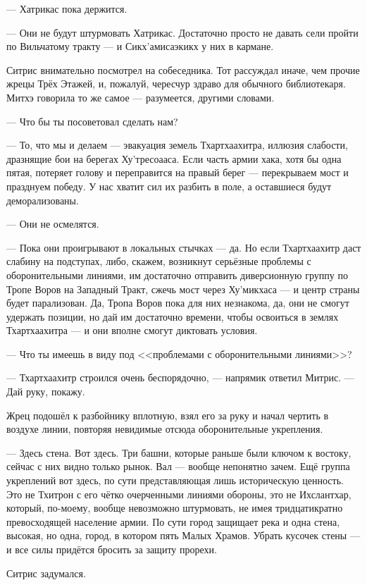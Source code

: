 --- Хатрикас пока держится.

--- Они не будут штурмовать Хатрикас.
Достаточно просто не давать сели пройти по Вильчатому тракту --- и Сикх'амисаэкикх у них в кармане.

Ситрис внимательно посмотрел на собеседника.
Тот рассуждал иначе, чем прочие жрецы Трёх Этажей, и, пожалуй, чересчур здраво для обычного библиотекаря.
Митхэ говорила то же самое --- разумеется, другими словами.

--- Что бы ты посоветовал сделать нам?

--- То, что мы и делаем --- эвакуация земель Тхартхаахитра, иллюзия слабости, дразнящие бои на берегах Ху'тресоааса.
Если часть армии хака, хотя бы одна пятая, потеряет голову и переправится на правый берег --- перекрываем мост и празднуем победу.
У нас хватит сил их разбить в поле, а оставшиеся будут деморализованы.

--- Они не осмелятся.

--- Пока они проигрывают в локальных стычках --- да.
Но если Тхартхаахитр даст слабину на подступах, либо, скажем, возникнут серьёзные проблемы с оборонительными линиями, им достаточно отправить диверсионную группу по Тропе Воров на Западный Тракт, сжечь мост через Ху'микхаса --- и центр страны будет парализован.
Да, Тропа Воров пока для них незнакома, да, они не смогут удержать позиции, но дай им достаточно времени, чтобы освоиться в землях Тхартхаахитра --- и они вполне смогут диктовать условия.

--- Что ты имеешь в виду под <<проблемами с оборонительными линиями>>?

--- Тхартхаахитр строился очень беспорядочно, --- напрямик ответил Митрис.
--- Дай руку, покажу.

Жрец подошёл к разбойнику вплотную, взял его за руку и начал чертить в воздухе линии, повторяя невидимые отсюда оборонительные укрепления.

--- Здесь стена.
Вот здесь.
Три башни, которые раньше были ключом к востоку, сейчас с них видно только рынок.
Вал --- вообще непонятно зачем.
Ещё группа укреплений вот здесь, по сути представляющая лишь историческую ценность.
Это не Тхитрон с его чётко очерченными линиями обороны, это не Ихслантхар, который, по-моему, вообще невозможно штурмовать, не имея тридцатикратно превосходящей население армии.
По сути город защищает река и одна стена, высокая, но одна, город, в котором пять Малых Храмов.
Убрать кусочек стены --- и все силы придётся бросить за защиту прорехи.

Ситрис задумался.

